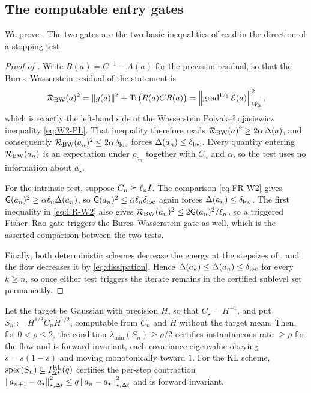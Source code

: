 \subsection{The computable entry gates}

We prove . The two gates are the two basic inequalities of
 read in the direction of a stopping test.

\begin{proof}[Proof of ]
    Write $R(a)=C^{-1}-A(a)$ for the precision residual, so that the Bures--Wasserstein
    residual of the statement is
    \[
        \mathcal R_{\mathrm{BW}}(a)^2
        =\left\lVert g(a)\right\rVert^2+\operatorname{Tr}\bigl(R(a)CR(a)\bigr)
        =\left\lVert \operatorname{grad}^{W_2}\mathcal{E}(a)\right\rVert_{W_2}^2 ,
    \]
    which is exactly the left-hand side of the Wasserstein
    Polyak--{\L}ojasiewicz inequality \eqref{eq:W2-PL}. That inequality therefore reads
    $\mathcal R_{\mathrm{BW}}(a)^2\geq2\alpha\,\Delta(a)$, and consequently
    $\mathcal R_{\mathrm{BW}}(a_n)^2\leq2\alpha\,\delta_{\mathrm{loc}}$ forces
    $\Delta(a_n)\leq\delta_{\mathrm{loc}}$. Every quantity entering
    $\mathcal R_{\mathrm{BW}}(a_n)$ is an expectation under $\rho_{a_n}$ together with $C_n$ and
    $\alpha$, so the test uses no information about $a_\star$.

    For the intrinsic test, suppose $C_n\succeq\ell_nI$. The comparison
    \eqref{eq:FR-W2} gives $\mathsf{G}(a_n)^2\geq\alpha\ell_n\Delta(a_n)$, so
    $\mathsf{G}(a_n)^2\leq\alpha\ell_n\delta_{\mathrm{loc}}$ again forces
    $\Delta(a_n)\leq\delta_{\mathrm{loc}}$. The first inequality in \eqref{eq:FR-W2} also gives
    $\mathcal R_{\mathrm{BW}}(a_n)^2\leq2\mathsf{G}(a_n)^2/\ell_n$, so a triggered Fisher--Rao gate
    triggers the Bures--Wasserstein gate as well, which is the asserted comparison between
    the two tests.

    Finally, both deterministic schemes decrease the energy at the stepsizes of
    , and the flow decreases it by
    \eqref{eq:dissipation}. Hence $\Delta(a_k)\leq\Delta(a_n)\leq\delta_{\mathrm{loc}}$ for every
    $k\geq n$, so once either test triggers the iterate remains in the certified sublevel
    set permanently.
\end{proof}

\begin{proposition}
\label{prop:entry-Gauss}
Let the target be Gaussian with precision $H$, so that $C_\star=H^{-1}$, and put
$S_n:=H^{1/2}C_nH^{1/2}$, computable from $C_n$ and $H$ without the target mean. Then, for
$0<\rho\leq2$, the condition $\lambda_{\min}(S_n)\geq\rho/2$ certifies instantaneous rate
$\geq\rho$ for the flow and is forward invariant, each covariance eigenvalue obeying
$\dot s=s(1-s)$ and moving monotonically toward $1$. For the KL scheme,
$\operatorname{spec}(S_n)\subseteq I_{\Delta t}^{\mathrm{KL}}(q)$ certifies the per-step contraction
$\left\lVert a_{n+1}-a_\star\right\rVert_{\star,\Delta t}^2\leq q\left\lVert a_n-a_\star\right\rVert_{\star,\Delta t}^2$ and is
forward invariant.
\end{proposition}

